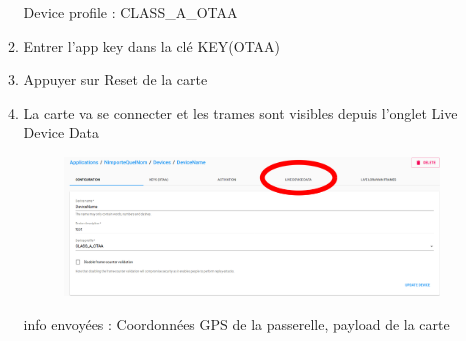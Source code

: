 \documentclass{article}
\begin{document}
\begin{itemize}
\begin{enumerate}
Device profile : CLASS\_A\_OTAA

\item Entrer l'app key dans la clé KEY(OTAA)

\item Appuyer sur Reset de la carte

\item La carte va se connecter et les trames sont visibles depuis l'onglet Live Device Data

\begin{figure}[H]
\begin{center}
\advance\leftskip-3cm
\advance\rightskip-3cm
\includegraphics[keepaspectratio=true,scale=0.3]{loraserver_device_data.png}
\label{visina8}
\end{center}\end{figure}




info envoyées : Coordonnées GPS de la passerelle, payload de la carte
\end{enumerate}


\end{itemize}
\end{document}
